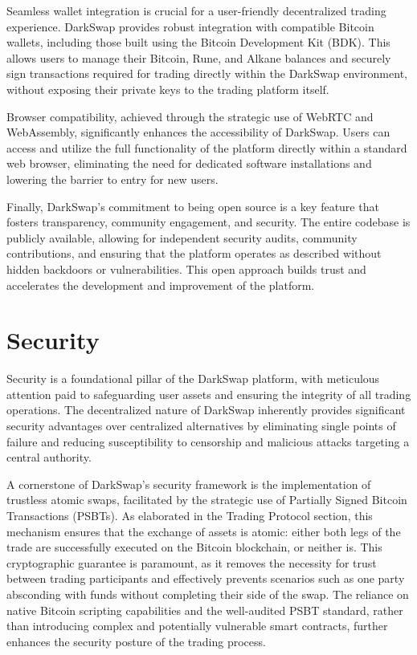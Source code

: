 \documentclass{article}
\begin{document}
Seamless wallet integration is crucial for a user-friendly decentralized trading experience. DarkSwap provides robust integration with compatible Bitcoin wallets, including those built using the Bitcoin Development Kit (BDK). This allows users to manage their Bitcoin, Rune, and Alkane balances and securely sign transactions required for trading directly within the DarkSwap environment, without exposing their private keys to the trading platform itself.

Browser compatibility, achieved through the strategic use of WebRTC and WebAssembly, significantly enhances the accessibility of DarkSwap. Users can access and utilize the full functionality of the platform directly within a standard web browser, eliminating the need for dedicated software installations and lowering the barrier to entry for new users.

Finally, DarkSwap's commitment to being open source is a key feature that fosters transparency, community engagement, and security. The entire codebase is publicly available, allowing for independent security audits, community contributions, and ensuring that the platform operates as described without hidden backdoors or vulnerabilities. This open approach builds trust and accelerates the development and improvement of the platform.

\section{Security}
Security is a foundational pillar of the DarkSwap platform, with meticulous attention paid to safeguarding user assets and ensuring the integrity of all trading operations. The decentralized nature of DarkSwap inherently provides significant security advantages over centralized alternatives by eliminating single points of failure and reducing susceptibility to censorship and malicious attacks targeting a central authority.

A cornerstone of DarkSwap's security framework is the implementation of trustless atomic swaps, facilitated by the strategic use of Partially Signed Bitcoin Transactions (PSBTs). As elaborated in the Trading Protocol section, this mechanism ensures that the exchange of assets is atomic: either both legs of the trade are successfully executed on the Bitcoin blockchain, or neither is. This cryptographic guarantee is paramount, as it removes the necessity for trust between trading participants and effectively prevents scenarios such as one party absconding with funds without completing their side of the swap. The reliance on native Bitcoin scripting capabilities and the well-audited PSBT standard, rather than introducing complex and potentially vulnerable smart contracts, further enhances the security posture of the trading process.
\end{document}
